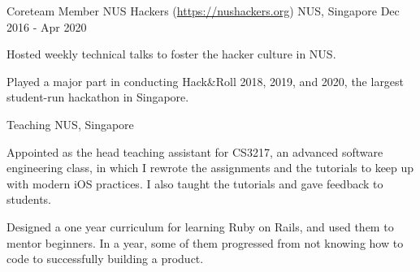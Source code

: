 

\begin{cventries}


  \cventry
  {Coreteam Member} %
  {NUS Hackers (\url{https://nushackers.org})} %
  {NUS, Singapore} %
  {Dec 2016 - Apr 2020} %
  { %
    \begin{cvitems}
    \item {Hosted weekly technical talks to foster the hacker culture in NUS.}
    \item {Played a major part in conducting Hack\&Roll 2018, 2019, and 2020, the largest student-run hackathon in Singapore.}
    \end{cvitems}
  }


  \cventry
  {} %
  {Teaching} %
  {NUS, Singapore} %
  {} %
  { %
    \begin{cvitems}
    \item {Appointed as the head teaching assistant for CS3217, an advanced software engineering class, in which I rewrote the assignments and the tutorials to keep up with modern iOS practices. I also taught the tutorials and gave feedback to students.}
    \item {Designed a one year curriculum for learning Ruby on Rails, and used them to mentor beginners. In a year, some of them progressed from not knowing how to code to successfully building a product.}
    \end{cvitems}
  }

\end{cventries}
